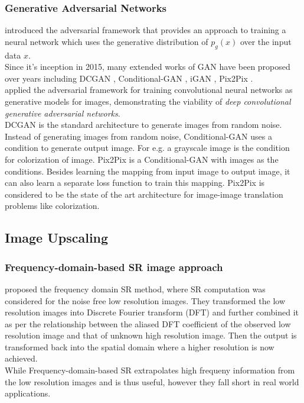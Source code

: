 \documentclass[oneside,a4paper,12pt]{report}
\begin{document}
		\subsubsection{Generative Adversarial Networks}
		\hspace*{0.25 in}\cite{goodfellow2014generative} introduced the adversarial framework that provides an approach to training a neural network which uses the generative distribution of $p_g(x)$ over the input data $x$.\\
		\hspace*{0.25 in}Since it's inception in 2015, many extended works of GAN have been proposed over years including DCGAN \cite{radford2016unsupervised}, Conditional-GAN \cite{mirza2014conditional}, iGAN \cite{zhu2018generative}, Pix2Pix \cite{isola2018imagetoimage}.\\
		\hspace*{0.25 in}\cite{radford2016unsupervised} applied the adversarial framework for training convolutional neural networks as generative models for images, demonstrating the viability of \textit{deep convolutional generative adversarial networks}.\\
		\hspace*{0.25 in}DCGAN is the standard architecture to generate images from random noise. Instead of generating images from random noise, Conditional-GAN \cite{mirza2014conditional} uses a condition to generate output image. For e.g. a grayscale image is the condition for colorization of image. Pix2Pix \cite{isola2018imagetoimage} is a Conditional-GAN with images as the conditions. Besides learning the mapping from input image to output image, it can also learn a separate loss function to train this mapping. Pix2Pix is considered to be the state of the art architecture for image-image translation problems like colorization.
		\subsection{Image Upscaling}
		\subsubsection{Frequency-domain-based SR image approach}
	  		\hspace*{0.25 in} \cite{tsai1984multiframe} proposed the frequency domain SR method, where SR computation was considered for the noise free low resolution images. They transformed the low resolution images into Discrete Fourier transform (DFT) and further combined it as per the relationship between the aliased DFT coefficient of the observed low resolution image and that of unknown high resolution image. Then the output is transformed back into the spatial domain where a higher resolution is now achieved.\\
        \hspace*{0.25 in} While Frequency-domain-based SR extrapolates high frequeny information from the low resolution images and is thus useful, however they fall short in real world applications.
\end{document}
